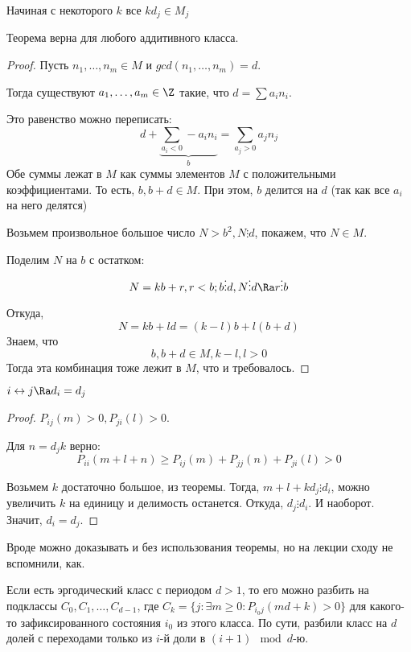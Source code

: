 \begin{theorem}
Начиная с некоторого $k$ все $k d_j \in M_j$
\end{theorem}
\begin{Rem}
Теорема верна для любого аддитивного класса.
\end{Rem}
\begin{proof}
Пусть $n_1, \dots, n_m \in M$ и $gcd(n_1, \dots, n_m) = d$.

Тогда существуют $a_1, \dots, a_m \in \Z$ такие, что $d = \sum a_i n_i$.

Это равенство можно переписать: $$d + \underbrace{\sum\limits_{a_i < 0} -a_i n_i}_{b} = \sum\limits_{a_j > 0} a_j n_j$$ 
Обе суммы лежат в $M$ как суммы элементов $M$ с положительными коэффициентами. То есть, $b, b + d \in M$. 
При этом, $b$ делится на $d$ (так как все $a_i$ на него делятся)

Возьмем произвольное большое число $N > b^2, N \vdots d$, покажем, что $N \in M$.

Поделим $N$ на $b$ с остатком: $$N = kb + r, r < b; b \vdots d, N \vdots d \Ra r \vdots b$$

Откуда, $$N = kb + ld = (k - l) b + l (b + d)$$ 
Знаем, что $$b, b + d \in M, k - l, l > 0$$ 
Тогда эта комбинация тоже лежит в $M$, что и требовалось.
\end{proof}

\begin{assertion}
$i \leftrightarrow j \Ra d_i = d_j$
\end{assertion}
\begin{proof}
$P_{ij}(m) > 0, P_{ji}(l) > 0$.

Для $n = d_jk$ верно: $$P_{ii}(m + l + n) \geq P_{ij}(m) + P_{jj}(n) + P_{ji}(l) > 0$$

Возьмем $k$ достаточно большое, из теоремы.
Тогда, $m + l + k d_j \vdots d_i$, можно увеличить $k$ на единицу и делимость останется. 
Откуда, $d_j \vdots d_i$. И наоборот. Значит, $d_i = d_j$.
\end{proof}
\begin{Rem}
Вроде можно доказывать и без использования теоремы, но на лекции сходу не вспомнили, как.
\end{Rem}

Если есть эргодический класс с периодом $d > 1$, то его можно разбить на подклассы $C_0, C_1, \dots, C_{d - 1}$, где $C_k = \{j \colon \exists m \geq 0 \colon P_{i_0j}(md + k) > 0\}$
для какого-то зафиксированного состояния $i_0$ из этого класса.
По сути, разбили класс на $d$ долей с переходами только из $i$-й доли в $(i + 1) \mod d$-ю.


